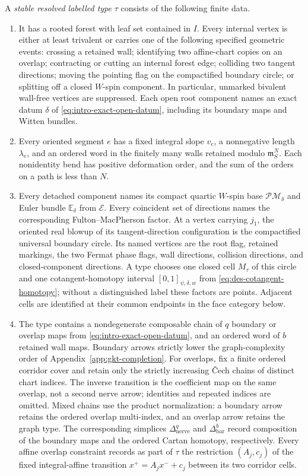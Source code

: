 \begin{definition}
\label{def:des-resolved-type}
A \emph{stable resolved labelled type} $\tau$ consists of the following
finite data.
\begin{enumerate}
\item It has a rooted forest with leaf set contained in $I$.  Every internal
vertex is either at least trivalent or carries one of the following specified
geometric events: crossing a retained wall; identifying two affine-chart
copies on an overlap; contracting or cutting an internal forest edge;
colliding two tangent directions; moving the pointing flag on the compactified
boundary circle; or splitting off a closed $W$-spin component.  In
particular, unmarked bivalent wall-free vertices are suppressed.  Each open
root component names an exact datum $\delta$ of
\eqref{eq:intro-exact-open-datum}, including its boundary maps and Witten
bundles.
\item Every oriented segment $e$ has a fixed integral slope $v_e$, a
nonnegative length $\lambda_e$, and an ordered word in the finitely many
walls retained modulo $\mathfrak m_S^N$.  Each nonidentity bend has positive
deformation order, and the sum of the orders on a path is less than $N$.
\item Every detached component names its compact quartic $W$-spin base
$\mathcal{PM}_{\delta}$ and Euler bundle $\mathbb E_{\delta}$ from
$\mathcal E$.  Every coincident set of directions names the corresponding
Fulton--MacPherson factor.  At a vertex carrying $j_1$, the oriented real
blowup of its tangent-direction configuration is the compactified universal
boundary circle.  Its named vertices are the root flag, retained markings,
the two Fermat phase flags, wall directions, collision directions, and
closed-component directions.  A type chooses one closed cell $M_\tau$ of
this circle and one cotangent-homotopy interval
$[0,1]_{\psi,\delta,w}$ from \eqref{eq:des-cotangent-homotopy}; without a
distinguished label these factors are points.  Adjacent cells are identified
at their common endpoints in the face category below.
\item The type contains a nondegenerate composable chain of $q$ boundary or
overlap maps from \eqref{eq:intro-exact-open-datum}, and an ordered word of
$b$ retained wall maps.  Boundary arrows strictly lower the graph-complexity
order of Appendix~\ref{app:gkt-completion}.  For overlaps, fix a finite
ordered corridor cover and retain only the strictly increasing \v{C}ech chains of
distinct chart indices.  The inverse transition is the coefficient map on
the same overlap, not a second nerve arrow; identities and repeated indices
are omitted.  Mixed chains use the product normalization: a boundary arrow
retains the ordered overlap multi-index, and an overlap arrow retains the
graph type.  The corresponding simplices
$\Delta^q_{\mathrm{nerve}}$ and $\Delta^b_{\mathrm{bar}}$ record composition
of the boundary maps and the ordered Cartan homotopy, respectively.  Every
affine overlap constraint records as part of $\tau$ the restriction
$(A_j,c_j)$ of the fixed integral-affine transition
$x^+=A_jx^-+c_j$ between its two corridor cells.
\end{enumerate}


\end{definition}
